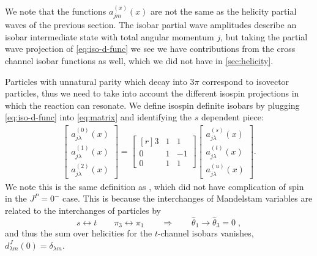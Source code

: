 \documentclass[10pt, aps,prd,amsmath,amssymb,superscriptaddress,onecolumn,
nofootinbib,showpacs,preprintnumbers]{revtex4-1}
\begin{document}
 We note that the functions \(a^{(x)}_{jm}(x)\) are not the same as the helicity partial waves of the previous section. The isobar partial wave amplitudes describe an isobar intermediate state with total angular momentum \(j\), but taking the partial wave projection of \cref{eq:iso-d-func} we see we have contributions from the cross channel isobar functions as well, which we did not have in \cref{sec:helicity}.

Particles with unnatural parity which decay into \(3\pi\) correspond to isovector particles, thus we need to take into account the different isospin projections in which the reaction can resonate.
We define isospin definite isobars by plugging \cref{eq:iso-d-func} into \cref{eq:matrix} and identifying the \(s\) dependent piece:
\begin{align}
  \begin{bmatrix}
  a^{(0)}_{j\lambda}(x) \\ a^{(1)}_{j\lambda}(x) \\ a^{(2)}_{j\lambda}(x)
  \end{bmatrix}
=
  \begin{bmatrix*}[r]
    3 & 1 & 1 \\ 	0 & 1 & -1 \\ 0 & 1 & 1
  \end{bmatrix*}
  \begin{bmatrix}
  a^{(s)}_{j\lambda}(x) \\ a^{(t)}_{j\lambda}(x) \\ a^{(u)}_{j\lambda}(x)
  \end{bmatrix}.
\end{align}
We note this is the same definition as \cite{Albaladejo2018}, which did not have complication of spin in the \(J^P = 0^-\) case. This is because the interchanges of Mandelstam variables are related to the interchanges of particles by
  \begin{equation}
    \label{frame-change}
    s\leftrightarrow  t  \qquad \pi_3 \leftrightarrow \pi_1 \qquad \Rightarrow \qquad \hat{\theta}_1 \to \hat{\theta}_3 = 0 \; ,
  \end{equation}
and thus the sum over helicities for the \(t\)-channel isobars vanishes, \(d_{\lambda m}^J(0) = \delta_{\lambda m} \).
\end{document}
